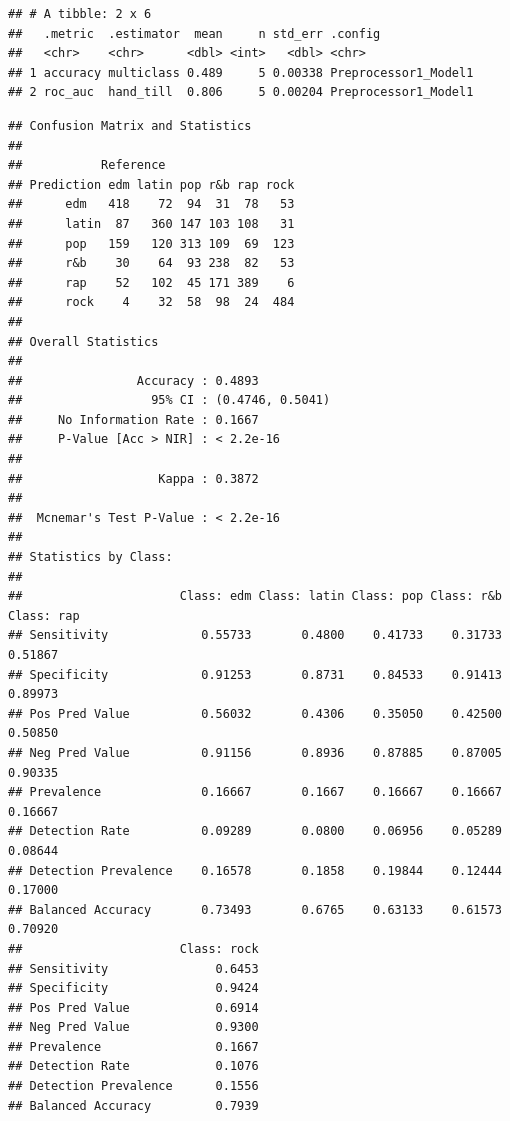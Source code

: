 \documentclass[
]{article}
\newenvironment{Shaded}{\begin{snugshade}}{\end{snugshade}}
\newcommand{\FunctionTok}[1]{\textcolor[rgb]{0.00,0.00,0.00}{#1}}
\newcommand{\NormalTok}[1]{#1}
\newcommand{\OtherTok}[1]{\textcolor[rgb]{0.56,0.35,0.01}{#1}}
\newcommand{\SpecialCharTok}[1]{\textcolor[rgb]{0.00,0.00,0.00}{#1}}
\begin{document}
\begin{verbatim}
## # A tibble: 2 x 6
##   .metric  .estimator  mean     n std_err .config             
##   <chr>    <chr>      <dbl> <int>   <dbl> <chr>               
## 1 accuracy multiclass 0.489     5 0.00338 Preprocessor1_Model1
## 2 roc_auc  hand_till  0.806     5 0.00204 Preprocessor1_Model1
\end{verbatim}

\begin{Shaded}
\end{Shaded}

\begin{verbatim}
## Confusion Matrix and Statistics
## 
##           Reference
## Prediction edm latin pop r&b rap rock
##      edm   418    72  94  31  78   53
##      latin  87   360 147 103 108   31
##      pop   159   120 313 109  69  123
##      r&b    30    64  93 238  82   53
##      rap    52   102  45 171 389    6
##      rock    4    32  58  98  24  484
## 
## Overall Statistics
##                                           
##                Accuracy : 0.4893          
##                  95% CI : (0.4746, 0.5041)
##     No Information Rate : 0.1667          
##     P-Value [Acc > NIR] : < 2.2e-16       
##                                           
##                   Kappa : 0.3872          
##                                           
##  Mcnemar's Test P-Value : < 2.2e-16       
## 
## Statistics by Class:
## 
##                      Class: edm Class: latin Class: pop Class: r&b Class: rap
## Sensitivity             0.55733       0.4800    0.41733    0.31733    0.51867
## Specificity             0.91253       0.8731    0.84533    0.91413    0.89973
## Pos Pred Value          0.56032       0.4306    0.35050    0.42500    0.50850
## Neg Pred Value          0.91156       0.8936    0.87885    0.87005    0.90335
## Prevalence              0.16667       0.1667    0.16667    0.16667    0.16667
## Detection Rate          0.09289       0.0800    0.06956    0.05289    0.08644
## Detection Prevalence    0.16578       0.1858    0.19844    0.12444    0.17000
## Balanced Accuracy       0.73493       0.6765    0.63133    0.61573    0.70920
##                      Class: rock
## Sensitivity               0.6453
## Specificity               0.9424
## Pos Pred Value            0.6914
## Neg Pred Value            0.9300
## Prevalence                0.1667
## Detection Rate            0.1076
## Detection Prevalence      0.1556
## Balanced Accuracy         0.7939
\end{verbatim}
\end{document}
